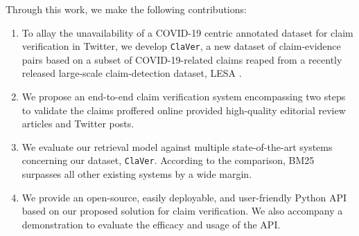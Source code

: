 \documentclass[11pt]{article}
\newcommand{\dataset}{\texttt{ClaVer}}
\begin{document}
Through this work, we make the following contributions:
\begin{enumerate}
    \item To allay the unavailability of a COVID-19 centric annotated dataset for claim verification in Twitter, we develop \dataset, a new dataset of claim-evidence pairs based on a subset of COVID-19-related claims reaped from a recently released large-scale claim-detection dataset, LESA \cite{gupta2021lesa}.
    \item We propose an end-to-end claim verification system encompassing two steps to validate the claims proffered online provided high-quality editorial review articles and Twitter posts.  
    \item We evaluate our retrieval model against multiple  state-of-the-art systems concerning our dataset, \dataset. According to the comparison, BM25 surpasses all other existing systems by a wide margin. 
    \item We provide an open-source, easily deployable, and user-friendly Python API based on our proposed solution for claim verification. We also accompany a demonstration to evaluate the efficacy and usage of the API.
\end{enumerate}
\end{document}

